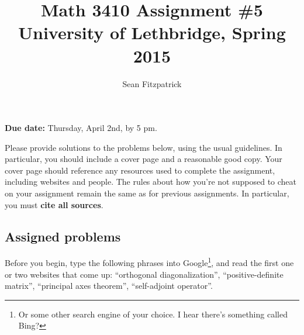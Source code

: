 \documentclass[letterpaper,12pt]{article}
\title{Math 3410 Assignment \#5\\University of Lethbridge, Spring 2015}
\author{Sean Fitzpatrick}
\begin{document}
 \maketitle

{\bf Due date:} Thursday, April 2nd, by 5 pm.

\bigskip

Please provide solutions to the problems below, using the usual guidelines. In particular, you should include a cover page and a reasonable good copy. Your cover page should reference any resources used to complete the assignment, including websites and people. The rules about how you're not supposed to cheat on your assignment remain the same as for previous assignments. In particular, you must {\bf cite all sources}.
\subsection*{Assigned problems}
Before you begin, type the following phrases into Google\footnote{Or some other search engine of your choice. I hear there's something called Bing?}, and read the first one or two websites that come up: ``orthogonal diagonalization'', ``positive-definite matrix'', ``principal axes theorem'', ``self-adjoint operator''.
\end{document}
